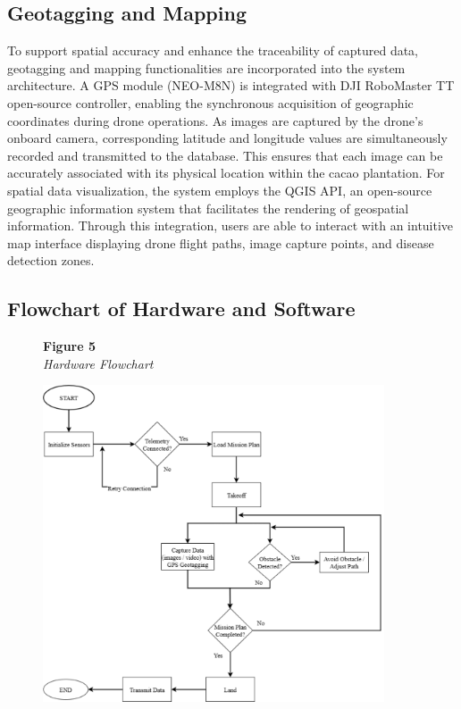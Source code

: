 	\subsection{Geotagging and Mapping}
	To support spatial accuracy and enhance the traceability of captured data, geotagging and mapping functionalities are incorporated into the system architecture. A GPS module (NEO-M8N) is integrated with DJI RoboMaster TT open-source controller, enabling the synchronous acquisition of geographic coordinates during drone operations. As images are captured by the drone’s onboard camera, corresponding latitude and longitude values are simultaneously recorded and transmitted to the database. This ensures that each image can be accurately associated with its physical location within the cacao plantation. For spatial data visualization, the system employs the QGIS API, an open-source geographic information system that facilitates the rendering of geospatial information. Through this integration, users are able to interact with an intuitive map interface displaying drone flight paths, image capture points, and disease detection zones.
	
	\subsection{Flowchart of Hardware and Software}
	
	\begin{figure}[H]
		\raggedright
		\textbf{Figure 5} \\ %
		\textit{Hardware Flowchart} %
		
		\vspace{0.5em}
		\centering
		\includegraphics[width=0.9\textwidth]{figures/Hard_Flow.pdf} %
		
		\vspace{0.5em}
		\raggedright
		
		\label{fig:HardFlow}
	\end{figure}
	
